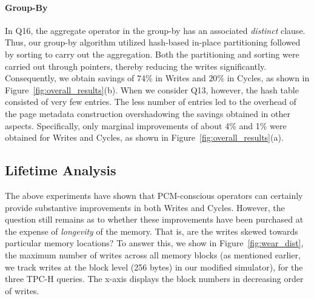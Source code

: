 \paragraph{Group-By}
In Q16, the aggregate operator in the group-by has an associated
\textit{distinct} clause.  Thus, our group-by algorithm utilized
hash-based in-place partitioning followed by sorting to carry out the
aggregation. Both the partitioning and sorting were carried out through
pointers, thereby reducing the writes significantly. Consequently,
we obtain savings of $74\%$ in Writes and $20\%$ in Cycles, as shown
in Figure~\ref{fig:overall_results}(b).  When we consider Q13, however,
the hash table consisted of very few entries. The less number of entries
led to the overhead of the page metadata construction overshadowing the
savings obtained in other aspects. Specifically, only marginal improvements
of about 4\% and 1\% were obtained for Writes and Cycles, as shown in
Figure~\ref{fig:overall_results}(a).

\begin{figure*}[t]
\centering

\caption{Queries wear distribution }
\label{fig:wear_dist}
\end{figure*}



\subsection{Lifetime Analysis}
\begin{comment}
In \cite{qureshi}, the ideal lifetime $Y$ of a PCM device with size $S$
GB, $B$ write traffic, and cell endurance $W_{max}$, is given by:

$Y(years) = \frac{W_{max} \times S}{B} \times 2^{-25}$\\
\end{comment}

The above experiments have shown that PCM-conscious operators
can certainly provide substantive improvements in both Writes and
Cycles. However, the question still remains as to whether these
improvements have been purchased at the expense of \emph{longevity} of
the memory. That is, are the writes skewed towards particular memory
locations?  To answer this, we show in Figure~\ref{fig:wear_dist}, the
maximum number of writes  across all memory blocks (as mentioned earlier,
we track writes at the block level (256 bytes) in our modified simulator),
for the three TPC-H queries. The x-axis displays the block numbers in
decreasing order of writes.

